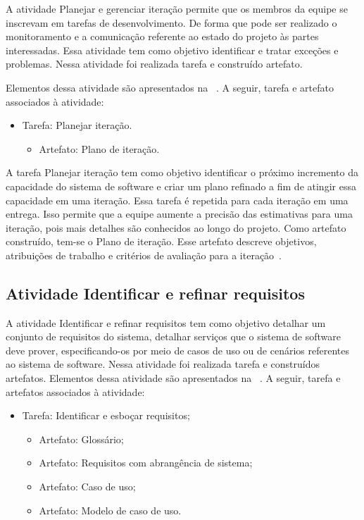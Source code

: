 A atividade Planejar e gerenciar iteração permite que os membros da equipe se inscrevam em tarefas de desenvolvimento. De forma que pode ser realizado o monitoramento e a comunicação referente ao estado do projeto às partes interessadas. Essa atividade tem como objetivo identificar e tratar exceções e problemas. Nessa atividade foi realizada tarefa e construído artefato. 

%

Elementos dessa atividade são apresentados na ~. A seguir, tarefa e artefato associados à atividade:

\begin{itemize}
    \item Tarefa: Planejar iteração.
        \begin{itemize}
            \item Artefato: Plano de iteração.
        \end{itemize}
\end{itemize}

A tarefa Planejar iteração tem como objetivo identificar o próximo incremento da capacidade do sistema de software e criar um plano refinado a fim de atingir essa capacidade em uma iteração. Essa tarefa é repetida para cada iteração em uma entrega. Isso permite que a equipe aumente a precisão das estimativas para uma iteração, pois mais detalhes são conhecidos ao longo do projeto. Como artefato construído, tem-se  o Plano de iteração. Esse artefato descreve objetivos, atribuições de trabalho e critérios de avaliação para a iteração~\cite{openup}.

\subsection{Atividade Identificar e refinar requisitos}

A atividade Identificar e refinar requisitos tem como objetivo detalhar um conjunto de requisitos do sistema, detalhar serviços que o sistema de software deve prover, especificando-os por meio de casos de uso ou de cenários referentes ao sistema de software. Nessa atividade foi realizada tarefa e construídos artefatos. Elementos dessa atividade são apresentados na ~. A seguir, tarefa e artefatos associados à atividade:

\begin{itemize}
    \item Tarefa: Identificar e esboçar requisitos;
        \begin{itemize}
            \item Artefato: Glossário;
            \item Artefato: Requisitos com abrangência de sistema;
            \item Artefato: Caso de uso;
            \item Artefato: Modelo de caso de uso.
        \end{itemize}
\end{itemize}

